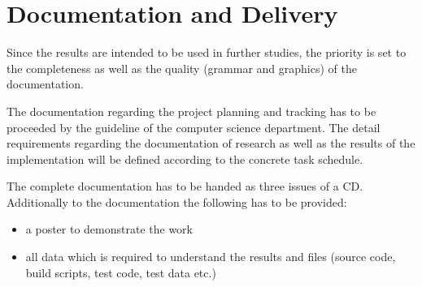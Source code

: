 \section*{Documentation and Delivery}

Since the results are intended to be used in further studies, the priority is set
to the completeness as well as the quality (grammar and graphics) of the
documentation.

The documentation regarding the project planning and tracking has to be
proceeded by the guideline of the computer science department. The detail
requirements regarding the documentation of research as well as the results of
the implementation will be defined according to the concrete task schedule.

The complete documentation has to be handed as three issues of a CD.
Additionally to the documentation the following has to be provided:

\begin{itemize}
    \item a poster to demonstrate the work
    \item all data which is required to understand the results and files (source
      code, build scripts, test code, test data etc.)
\end{itemize}

